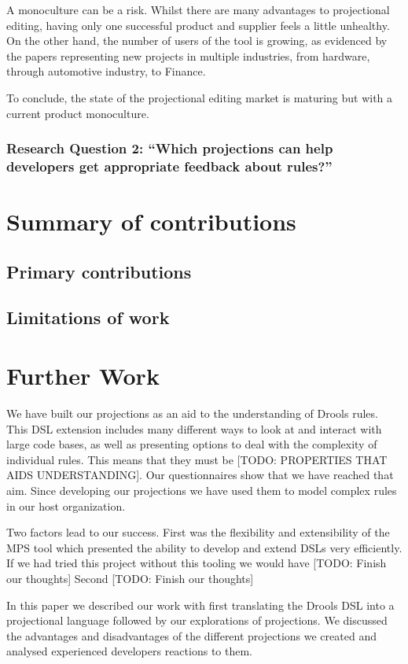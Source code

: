 A monoculture can be a risk.
Whilst there are many advantages to projectional editing, having only one successful product and supplier feels a little unhealthy.
On the other hand, the number of users of the tool is growing, as evidenced by the papers representing new projects in multiple industries, from hardware, through automotive industry, to Finance.

To conclude, the state of the projectional editing market is maturing but with a current product monoculture.

\subsubsection{Research Question 2: ``Which projections can help developers get appropriate feedback about rules?''}



\section{Summary of contributions}
\subsection{Primary contributions}
\subsection{Limitations of work}
\section{Further Work}

We have built our projections as an aid to the understanding of Drools rules.
This DSL extension includes many different ways to look at and interact with large code bases, as well as presenting options to deal with the complexity of individual rules.
This means that they must be [TODO: PROPERTIES THAT AIDS UNDERSTANDING].
Our questionnaires show that we have reached that aim.
Since developing our projections we have used them to model complex rules in our host organization.

Two factors lead to our success.
First was the flexibility and extensibility of the MPS tool which presented the ability to develop and extend DSLs very efficiently.
If we had tried this project without this tooling we would have [TODO: Finish our thoughts]
Second [TODO: Finish our thoughts]

In this paper we described our work with first translating the Drools DSL into a projectional language followed by our explorations of projections.
We discussed the advantages and disadvantages of the different projections we created and analysed experienced developers reactions to them.

